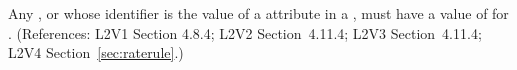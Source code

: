 Any \Compartment, \Species or \Parameter whose identifier is the value of a
 attribute in a \RateRule, must have a value of 
for .  (References: L2V1 Section 4.8.4; L2V2 Section~4.11.4;
L2V3 Section~4.11.4; L2V4 Section~\ref{sec:raterule}.)

